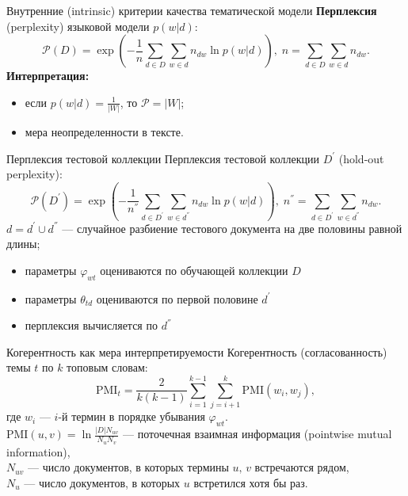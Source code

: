 \documentclass{beamer}
\begin{document}
\begin{frame}{Внутренние (intrinsic) критерии качества тематической модели}
\textbf{Перплексия} (perplexity) языковой модели $p(w|d)$:
\begin{equation*}
    \mathcal{P}(D) = \exp \left( -\frac{1}{n}\sum\limits_{d \in D}\sum\limits_{w \in d}n_{dw}\ln p(w|d)\right), \; n = \sum\limits_{d \in D}\sum\limits_{w \in d}n_{dw}.
\end{equation*}
\vspace{4\ex}
\textbf{Интерпретация:}
\begin{itemize}
    \item если $p(w|d) = \frac{1}{|W|}$, то $\mathcal{P} = |W|$;
    \item мера неопределенности в тексте.
\end{itemize}
\end{frame}

\begin{frame}{Перплексия тестовой коллекции}
Перплексия тестовой коллекции $D^{'}$ (hold-out perplexity):
\begin{equation*}
    \mathcal{P}(D^{'}) = \exp \left( -\frac{1}{n^{''}}\sum\limits_{d \in D^{'}}\sum\limits_{w \in d^{''}}n_{dw}\ln p(w|d)\right), \; n^{''} = \sum\limits_{d \in D^{'}}\sum\limits_{w \in d^{''}}n_{dw}.
\end{equation*}
\vspace{2\ex}
$d = d^{'} \cup d^{''}$ --- случайное разбиение тестового документа на две половины равной длины;
\vspace{2\ex}
\begin{itemize}
    \item параметры $\varphi_{wt}$ оцениваются по обучающей коллекции $D$
    \item параметры $\theta_{td}$ оцениваются по первой половине $d^{'}$
    \item перплексия вычисляется по $d^{''}$
\end{itemize}
\end{frame}

\begin{frame}{Когерентность как мера интерпретируемости}
Когерентность (согласованность) темы $t$ по $k$ топовым словам:
\begin{equation*}
    \text{PMI}_{t} = \frac{2}{k(k-1)}\sum\limits_{i=1}^{k-1}\sum\limits_{j =i+1}^{k}\text{PMI}(w_i, w_j),
\end{equation*}
где $w_i$ --- $i$-й термин в порядке убывания $\varphi_{wt}$.\\
\vspace{2\ex}
$\text{PMI}(u, v) = \ln{\frac{|D|N_{uv}}{N_uN_v}}$ --- поточечная взаимная информация (pointwise mutual information),\\
\vspace{2\ex}
$N_{uv}$ --- число документов, в которых термины $u,\, v$ встречаются рядом,\\
\vspace{2\ex}
$N_{u}$ --- число документов, в которых $u$ встретился хотя бы раз.
\end{frame}
\end{document}
